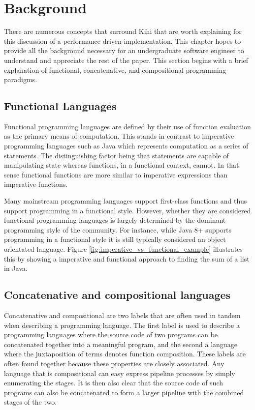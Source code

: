 \chapter{Background} \label{C:background} 
There are numerous concepts that surround Kihi that are
worth explaining for this discussion of a performance
driven implementation.
This chapter hopes to provide all the background
necessary for an undergraduate software engineer
to understand and appreciate the rest of the paper.
This section begins with a brief explanation of 
functional, concatenative, and compositional
programming paradigms.

\section{Functional Languages}
Functional programming languages are defined by their use
of function evaluation as the primary means of computation.
This stands in contrast to imperative programming languages
such as Java which represents computation as a series of 
statements. The distinguishing factor being that statements
are capable of manipulating state whereas functions,
in a functional context, cannot.
In that sense functional functions are more similar to imperative
expressions than imperative functions.

Many mainstream programming languages support first-class functions and thus support programming in a functional style. However, whether they are considered functional programming languages is largely determined by the dominant programming style of the community. For instance, while Java 8+ supports programming in a functional style it is still typically considered an object orientated language. Figure
\ref{fig:imperative_vs_functional_example} illustrates this by showing a imperative and functional approach to finding the sum
of a list in Java.






\section{Concatenative and compositional languages}
Concatenative and compositional are two labels that are often used in tandem when describing a programming language. The first label is used to describe a programming languages where the source code of two programs can be concatenated together into a meaningful program, and the second a language where the juxtaposition of terms denotes function composition. These labels are often found together because these properties are closely associated. Any language that is compositional can easy express pipeline processes by simply enumerating the stages. It is then also clear that the source code of such programs can also be concatenated to form a larger pipeline with the combined stages of the two.

